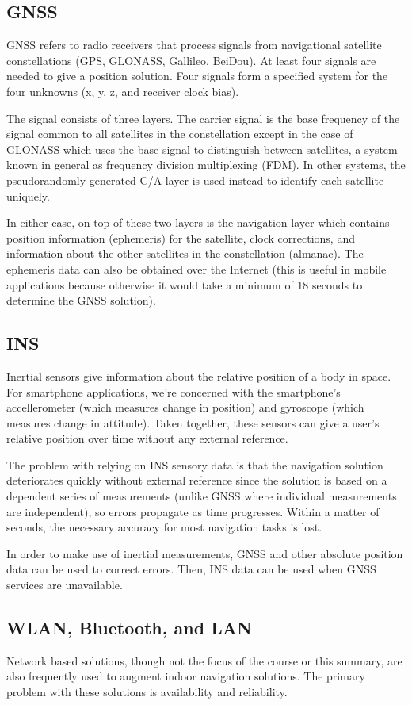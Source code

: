 \documentclass[twoside]{article}
\begin{document}
\subsection{GNSS}
GNSS refers to radio receivers that process signals from navigational satellite constellations
(GPS, GLONASS, Gallileo, BeiDou). At least four signals are needed to give a position solution.
Four signals form a specified system for the four unknowns (x, y, z, and receiver clock bias).

The signal consists of three layers. The carrier signal is the base frequency of the signal
common to all satellites in the constellation except in the case of GLONASS which uses the base
signal to distinguish between satellites, a system known in general as frequency
division multiplexing (FDM). In other systems, the pseudorandomly generated C/A layer is used
instead to identify each satellite uniquely.

In either case, on top of these two layers is the navigation layer which contains position information
(ephemeris) for the satellite, clock corrections, and information about the other satellites in the
constellation (almanac). The ephemeris data can also be obtained over the Internet (this is useful
in mobile applications because otherwise it would take a minimum of 18 seconds to determine
the GNSS solution).
\subsection{INS}
Inertial sensors give information about the relative position of a body in space. For smartphone
applications, we're concerned with the smartphone's accellerometer (which measures change in position)
and gyroscope (which measures change in attitude). Taken together, these sensors can give a user's
relative position over time without any external reference.

The problem with relying on INS sensory data is that the navigation solution deteriorates quickly
without external reference since the solution is based on a dependent series of measurements (unlike
GNSS where individual measurements are independent), so errors propagate as time progresses.
Within a matter of seconds, the necessary accuracy for most navigation tasks is lost.

In order to make use of inertial measurements, GNSS and other absolute position data can be used
to correct errors. Then, INS data can be used when GNSS services are unavailable.
\subsection{WLAN, Bluetooth, and LAN}
Network based solutions, though not the focus of the course or this summary, are also frequently used
to augment indoor navigation solutions. The primary problem with these solutions is availability
and reliability.
\end{document}
